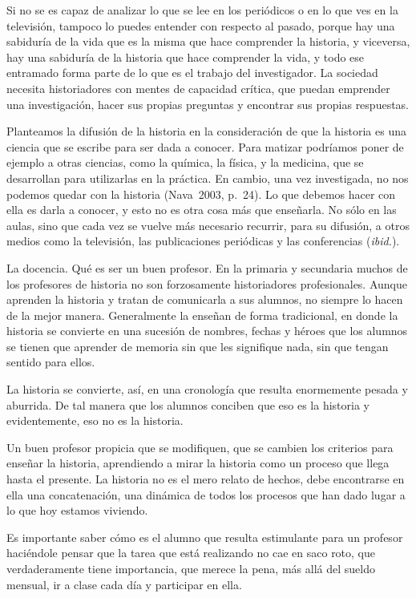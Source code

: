  
Si no se es capaz de analizar lo que se lee en los periódicos o en lo 
que ves en la televisión, tampoco lo puedes entender con respecto al 
pasado, porque hay una sabiduría de la vida que es la misma que hace 
comprender la historia, y viceversa, hay una sabiduría de la historia 
que hace comprender la vida, y todo ese entramado forma parte de lo que 
es el trabajo del investigador. La sociedad necesita historiadores con 
mentes de capacidad crítica, que puedan emprender una investigación, 
hacer sus propias preguntas y encontrar sus propias respuestas.

 
Planteamos la difusión de la historia en la consideración de que la 
historia es una ciencia que se escribe para ser dada a conocer. Para 
matizar podríamos poner de ejemplo a otras ciencias, como la química, 
la física, y la medicina, que se desarrollan para utilizarlas en la 
práctica. En cambio, una vez investigada, no nos podemos quedar con la 
historia (Nava~2003, p.~24). Lo que debemos hacer con ella es 
darla a conocer, y esto no es otra cosa más que enseñarla. No sólo en 
las aulas, sino que cada vez se vuelve más necesario recurrir, para su 
difusión, a otros medios como la televisión, las publicaciones 
periódicas y las conferencias ({\itshape ibid.}).
\enlargethispage{1\baselineskip}
 
La docencia. Qué es ser un buen profesor. En la primaria y  secundaria 
muchos de los profesores de historia no son forzosamente historiadores 
profesionales. Aunque aprenden la historia y tratan de comunicarla a 
sus alumnos, no siempre lo hacen de la mejor manera. Generalmente la 
enseñan de forma tradicional, en donde la historia se convierte en una 
sucesión de nombres, fechas y héroes que los alumnos se tienen que 
aprender de memoria sin que les signifique nada, sin que tengan sentido 
para ellos.

 
La historia se convierte, así,  en una cronología que resulta 
enormemente pesada y aburrida. De tal manera que los alumnos conciben 
que eso es la historia y evidentemente, eso no es la historia.

 
Un buen profesor propicia que se  modifiquen, que se cambien los 
criterios para enseñar la historia, aprendiendo a mirar  la historia 
como un proceso que llega hasta  el presente.  La historia no es el 
mero relato de hechos,  debe encontrarse en ella una concatenación, una 
dinámica de todos los procesos que han dado lugar a lo que hoy estamos 
viviendo.

 
Es importante saber cómo es el alumno que resulta estimulante para un 
profesor haciéndole pensar que la tarea que está realizando no cae en 
saco roto, que verdaderamente tiene importancia, que merece la pena, 
más allá del sueldo mensual,  ir a clase cada día y participar en ella.

